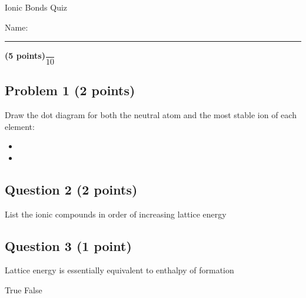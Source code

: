 \documentclass[12pt, letterpaper]{memoir}
\begin{document}
	\begin{center}
		{\large Ionic Bonds Quiz}
	\end{center}
	{\large Name: \rule[-1mm]{4in}{.1pt} {\bfseries (5 points)}\hspace{4em}$\dfrac{~}{10}$} 
	
	\subsection*{Problem 1 (2 points)}
	Draw the dot diagram for both the neutral atom and the most stable ion of each element:
	\begin{itemize}
		\item {}
		\item \vspace{2em}
	\end{itemize}
	
	\vspace{2em}
	\subsection*{Question 2 (2 points)}
	List the ionic compounds in order of increasing lattice energy
	
	 \hspace{2em}  \hspace{2em}  \hspace{2em}  \hspace{2em} 
	
	\vspace{8em}
	\subsection*{Question 3 (1 point)}
	Lattice energy is essentially equivalent to enthalpy of formation
	
	{\Large True \hspace{2em} False}
	
\end{document}
